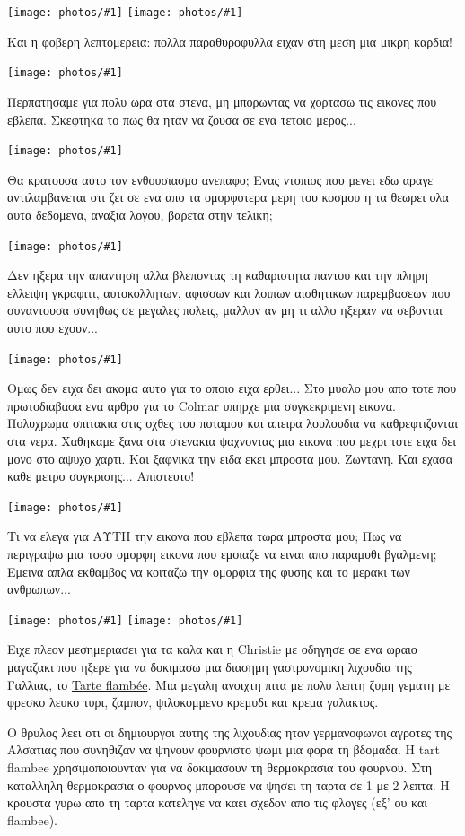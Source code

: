 \documentclass[11pt, letterpaper]{book}
\newcommand\photo[1]{\noindent\texttt{[image: photos/\#1]}}
\begin{document}
\photo{103.jpg}
\photo{104.jpg}

Και η φοβερη λεπτομερεια: πολλα παραθυροφυλλα ειχαν στη μεση μια μικρη καρδια!

\photo{105.jpg}

Περπατησαμε για πολυ ωρα στα στενα, μη μπορωντας να χορτασω τις εικονες που εβλεπα. Σκεφτηκα το πως θα ηταν να ζουσα σε ενα τετοιο μερος...

\photo{106.jpg}

Θα κρατουσα αυτο τον ενθουσιασμο ανεπαφο; Ενας ντοπιος που μενει εδω αραγε αντιλαμβανεται οτι ζει σε ενα απο τα ομορφοτερα μερη του κοσμου η τα θεωρει ολα αυτα δεδομενα, αναξια λογου, βαρετα στην τελικη;

\photo{107.jpg}

Δεν ηξερα την απαντηση αλλα βλεποντας τη καθαριοτητα παντου και την πληρη ελλειψη γκραφιτι, αυτοκολλητων, αφισσων και λοιπων αισθητικων παρεμβασεων που συναντουσα συνηθως σε μεγαλες πολεις, μαλλον αν μη τι αλλο ηξεραν να σεβονται αυτο που εχουν...

\photo{108.jpg}

Ομως δεν ειχα δει ακομα αυτο για το οποιο ειχα ερθει...
Στο μυαλο μου απο τοτε που πρωτοδιαβασα ενα αρθρο για το Colmar υπηρχε μια συγκεκριμενη εικονα. Πολυχρωμα σπιτακια στις οχθες του ποταμου και απειρα λουλουδια να καθρεφτιζονται στα νερα.
Χαθηκαμε ξανα στα στενακια ψαχνοντας μια εικονα που μεχρι τοτε ειχα δει μονο στο αψυχο χαρτι.
Και ξαφνικα την ειδα εκει μπροστα μου. Ζωντανη. Και εχασα καθε μετρο συγκρισης... Απιστευτο!

\photo{109.jpg}

Τι να ελεγα για ΑΥΤΗ την εικονα που εβλεπα τωρα μπροστα μου; Πως να περιγραψω μια τοσο ομορφη εικονα που εμοιαζε να ειναι απο παραμυθι βγαλμενη;
Εμεινα απλα εκθαμβος να κοιταζω την ομορφια της φυσης και το μερακι των ανθρωπων...

\photo{110.jpg}
\photo{111.jpg}

Ειχε πλεον μεσημεριασει για τα καλα και η Christie με οδηγησε σε ενα ωραιο μαγαζακι που ηξερε για να δοκιμασω μια διασημη γαστρονομικη λιχουδια της Γαλλιας, το \href{http://en.wikipedia.org/wiki/Tarte_flamb%C3%A9e}{Tarte flambée}. Μια μεγαλη ανοιχτη πιτα με πολυ λεπτη ζυμη γεματη με φρεσκο λευκο τυρι, ζαμπον, ψιλοκομμενο κρεμυδι και κρεμα γαλακτος.

Ο θρυλος λεει οτι οι δημιουργοι αυτης της λιχουδιας ηταν γερμανοφωνοι αγροτες της Αλσατιας που συνηθιζαν να ψηνουν φουρνιστο ψωμι μια φορα τη βδομαδα. Η tart flambee χρησιμοποιουνταν για να δοκιμασουν τη θερμοκρασια του φουρνου. Στη καταλληλη θερμοκρασια ο φουρνος μπορουσε να ψησει τη ταρτα σε 1 με 2 λεπτα. Η κρουστα γυρω απο τη ταρτα κατεληγε να καει σχεδον απο τις φλογες (εξ' ου και flambee).
\end{document}
